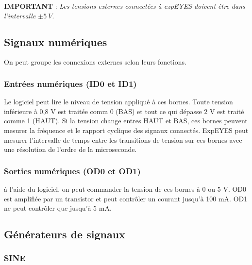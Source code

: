 \documentclass{book}
\begin{document}
\textbf{IMPORTANT} : \emph{Les tensions externes connectées à expEYES doivent être dans l'intervalle $\pm{}5\ V$}.




\subsection{Signaux numériques}


On peut groupe les connexions externes selon leurs fonctions.




\subsubsection{Entrées numériques (ID0 et ID1)}


Le logiciel peut lire le niveau de tension appliqué à ces bornes. Toute tension inférieure à 0,8 V est traitée comm 0 (BAS) et tout ce qui dépasse 2 V est traité comme 1 (HAUT). Si la tension change entres HAUT et BAS, ces bornes peuvent mesurer la fréquence et le rapport cyclique des signaux connectés. ExpEYES peut mesurer l'intervalle de temps entre les transitions de tension sur ces bornes avec une résolution de l'ordre de la microseconde.




\subsubsection{Sorties numériques (OD0 et OD1)}





à l'aide du logiciel, on peut commander la tension de ces bornes à 0 ou 5 V. OD0 est amplifiée par un transistor et peut contrôler un courant jusqu'à 100 mA. OD1 ne peut contrôler que jusqu'à 5 mA.




\subsection{Générateurs de signaux}






\subsubsection{SINE}
\end{document}
